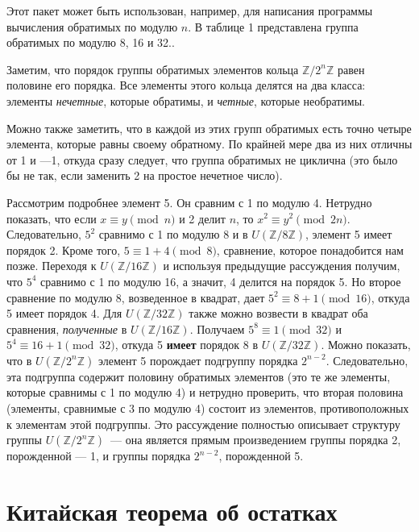 \documentclass{../../template/mai_book}
\begin{document}
    Этот пакет может быть использован, например, для написания программы вычисления обратимых по модулю $n$. В таблице 1 представлена группа обратимых по модулю 8, 16 и 32..

    Заметим, что порядок группы обратимых элементов кольца $\mathbb{Z}/2^n\mathbb{Z}$ равен половине его порядка. Все элементы этого кольца делятся на два класса: элементы \textit{нечетные}, которые обратимы, и \textit{четные}, которые необратимы.

    Можно также заметить, что в каждой из этих групп обратимых есть точно четыре элемента, которые равны своему обратному. По крайней мере два из них отличны от 1 и —1, откуда сразу следует, что группа обратимых не циклична (это было бы не так, если заменить 2 на простое нечетное число).

    Рассмотрим подробнее элемент 5. Он сравним с 1 по модулю 4. Нетрудно показать, что если $x \equiv y \pmod{n}$ и 2 делит $n$, то
    $x^2 \equiv y^2 \pmod{2n}$. Следовательно, $5^2$ сравнимо с 1 по модулю 8 и в $U(\mathbb{Z}/8\mathbb{Z})$, элемент 5 имеет порядок 2. Кроме того, $5 \equiv 1 + 4 \pmod{8}$, сравнение, которое понадобится нам позже. Переходя к $U(\mathbb{Z}/16\mathbb{Z})$ и используя предыдущие рассуждения получим, что $5^4$ сравнимо с 1 по модулю 16, а значит, 4 делится на порядок 5. Но второе сравнение по модулю 8, возведенное в квадрат, дает $5^2 \equiv 8 + 1 \pmod{16}$, откуда 5 имеет порядок 4. Для $U(\mathbb{Z}/32\mathbb{Z})$ также можно возвести в квадрат оба сравнения, \textit{полученные} в $U(\mathbb{Z}/16\mathbb{Z})$. Получаем $5^8 \equiv 1 \pmod{32}$ и $5^4 \equiv 16 + 1 \pmod{32}$, откуда 5 {\textbf{имеет}} порядок 8 в $U(\mathbb{Z}/32\mathbb{Z})$. Можно показать, что в $U(\mathbb{Z}/2^n\mathbb{Z})$ элемент 5 порождает подгруппу порядка $2^{n-2}$. Следовательно, эта подгруппа содержит половину обратимых элементов (это те же элементы, которые сравнимы с 1 по модулю 4) и нетрудно проверить, что вторая половина (элементы, сравнимые с 3 по модулю 4) состоит из элементов, противоположных к элементам этой подгруппы. Это рассуждение полностью описывает структуру группы $U(\mathbb{Z}/2^n\mathbb{Z})$~— она является прямым произведением группы порядка 2, порожденной — 1, и группы порядка $2^{n-2}$, порожденной 5.

    \section{Китайская теорема об остатках}
\end{document}
